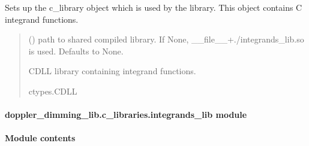 \documentclass[letterpaper,10pt,english]{sphinxmanual}
\begin{document}
\begin{fulllineitems}
\label{\detokenize{doppler_dimming_lib.c_libraries:doppler_dimming_lib.c_libraries.c_lib.get_c_library}}
\pysigstartsignatures
{}
\pysigstopsignatures
\sphinxAtStartPar
Sets up the c\_library object which is used by the library.
This object contains C integrand functions.
\begin{quote}\begin{description}
\sphinxAtStartPar
{} (\sphinxstyleliteralemphasis{\sphinxupquote{, }}) \textendash{} path to shared compiled library. If None, \_\_file\_\_+./integrands\_lib.so is used. Defaults to None.

\sphinxAtStartPar
CDLL library containing integrand functions.

\sphinxAtStartPar
ctypes.CDLL

\end{description}\end{quote}

\end{fulllineitems}



\paragraph{doppler\_dimming\_lib.c\_libraries.integrands\_lib module}
\label{\detokenize{doppler_dimming_lib.c_libraries:doppler-dimming-lib-c-libraries-integrands-lib-module}}

\paragraph{Module contents}
\label{\detokenize{doppler_dimming_lib.c_libraries:module-doppler_dimming_lib.c_libraries}}\label{\detokenize{doppler_dimming_lib.c_libraries:module-contents}}
\sphinxstepscope
\end{document}
